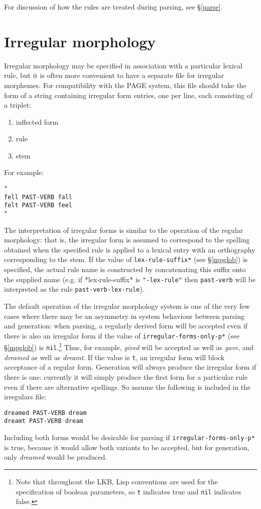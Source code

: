 \documentclass[12pt]{report}
\begin{document}
For discussion of how the rules are treated during parsing, see 
\S\ref{parse}.

\section{Irregular morphology}
\label{irregs}

Irregular morphology may be specified in association with a
particular lexical rule, but it is often more convenient
to have a separate file for irregular morphemes.  For compatibility
with the PAGE system, this file should take the form of a string
containing irregular form entries, one per line, each consisting of
a triplet: 
\begin{enumerate}
\item inflected form 
\item rule
\item stem
\end{enumerate}
For example:
\begin{verbatim}
"
fell PAST-VERB fall
felt PAST-VERB feel
"
\end{verbatim}
The interpretation of irregular forms is similar to the operation of the
regular morphology: that is, the irregular form is
assumed to correspond to the spelling obtained when the specified
rule is applied to a lexical entry with an orthography
corresponding to the stem.
If the value of 
{\tt *lex-rule-suffix*} (see \S\ref{mpglob}) is specified,
the actual rule name is constructed by concatenating this suffix
onto the supplied name (e.g. if *lex-rule-suffix* is {\tt "-lex-rule"}
then {\tt past-verb} will be interpreted as 
the rule {\tt past-verb-lex-rule}).

The default operation of the irregular morphology system is 
one of the very few cases where there may be an asymmetry in system
behaviour between parsing and generation: when parsing, 
a regularly derived form will be accepted even if there
is also an irregular form if the value of 
{\tt *irregular-forms-only-p*} (see \S\ref{mpglob}) is 
{\tt nil}.\footnote{Note that throughout the
LKB, Lisp conventions are used
for the specification of boolean parameters, so {\tt t} indicates
true and {\tt nil} indicates false.}
Thus, for example, {\it gived} will be accepted as well as {\it gave},
and {\it dreamed} as well as {\it dreamt}.  If the value is {\tt t},
an irregular form will block acceptance of a regular form.
Generation will always produce the irregular form if there is one:
currently it will simply produce the first form for a particular rule
even if there are alternative spellings.  So assume the following
is included in the irregulars file:
\begin{verbatim}
dreamed PAST-VERB dream
dreamt PAST-VERB dream
\end{verbatim}
Including both forms would be desirable for parsing if
{\tt *irregular-forms-only-p*} is true, because it would allow 
both variants to be accepted, but for generation, only {\it dreamed}
would be produced.
\end{document}

